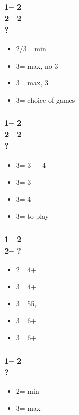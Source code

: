 \documentclass[12pt, a4paper]{report}
\begin{document}
{    \subsubsection*{1\nt -- 2\diams\\
                    2\hearts -- 2\spades\\
                    ?}
    \begin{itemize}
        \item 2\nt/3\hearts = min
        \item 3\clubs = max, no 3\hearts
        \item 3\diams = max, 3\hearts
        \item 3\nt = choice of games
    \end{itemize}

    \subsubsection*{1\nt -- 2\diams\\
                    2\hearts -- 2\nt\\
                    ?}
    \begin{itemize}
        \item 3\clubs = 3\hearts\ + 4\clubs
        \item 3\diams = 3\hearts
        \item 3\hearts = 4\clubs
        \item 3\nt = to play
    \end{itemize}

    \subsubsection*{1\nt -- 2\hearts\\
                    2\spades -- ?}
    \begin{itemize}
        \item 2\nt = 4+\clubs\ \gf
        \item 3\clubs = 4+\diams\ \gf
        \item 3\diams = 55\major, \inv
        \item 3\hearts = 6+\spades\ \gf
        \item 3\spades = 6+\spades\ \inv
    \end{itemize}

    \subsubsection*{1\nt -- 2\spades\\
                    ?}
    \begin{itemize}
        \item 2\nt = min
        \item 3\clubs = max
    \end{itemize}

}
\end{document}
